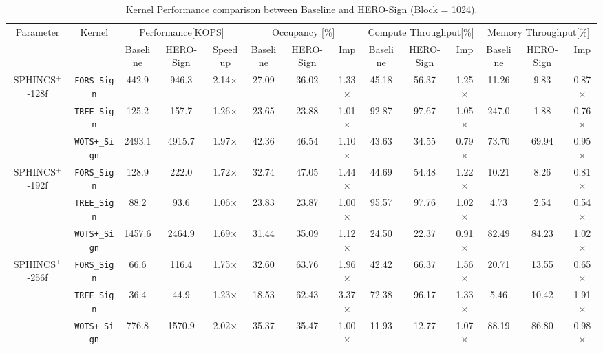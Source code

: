 \documentclass[10pt,conference]{IEEEtran}
\begin{document}
\begin{table}[tp]
\centering
\fontsize{6.}{8}\selectfont
\caption{Kernel Performance comparison between Baseline and HERO-Sign (Block = 1024).}
\label{tab:performance_comparison}
\begin{tabular}{c|c|ccc|ccc|ccc|ccc}
\hline
\multirow{2}{*}{Parameter} & \multirow{2}{*}{Kernel} 
& \multicolumn{3}{c|}{Performance[KOPS]} 
& \multicolumn{3}{c|}{Occupancy [\%]} 
& \multicolumn{3}{c|}{Compute Throughput[\%]} 
& \multicolumn{3}{c}{Memory Throughput[\%]} \\
\cline{3-14}
& & Baseline & HERO-Sign & Speedup & Baseline & HERO-Sign & Imp & Baseline & HERO-Sign & Imp & Baseline & HERO-Sign & Imp \\
\hline\hline
\multirow{3}{*}{SPHINCS$^+$-128f} 
& \texttt{FORS\_Sign} & 442.9 & 946.3 & 2.14× & 27.09 & 36.02 & 1.33× & 45.18 & 56.37 & 1.25× & 11.26 & 9.83 & 0.87× \\
& \texttt{TREE\_Sign} & 125.2 & 157.7 & 1.26× & 23.65 & 23.88 & 1.01× & 92.87 & 97.67 & 1.05× & 247.0 & 1.88 & 0.76× \\
& \texttt{WOTS+\_Sign} & 2493.1 & 4915.7 & 1.97× & 42.36 & 46.54 & 1.10× & 43.63 & 34.55 & 0.79× & 73.70 & 69.94 & 0.95× \\
\hline
\multirow{3}{*}{SPHINCS$^+$-192f} 
& \texttt{FORS\_Sign} & 128.9 & 222.0 & 1.72× & 32.74 & 47.05 & 1.44× & 44.69 & 54.48 & 1.22× & 10.21 & 8.26 & 0.81× \\
& \texttt{TREE\_Sign} & 88.2 & 93.6 & 1.06× & 23.83 & 23.87 & 1.00× & 95.57 & 97.76 & 1.02× & 4.73 & 2.54 & 0.54× \\
& \texttt{WOTS+\_Sign} & 1457.6 & 2464.9 & 1.69× & 31.44 & 35.09 & 1.12× & 24.50 & 22.37 & 0.91× & 82.49 & 84.23 & 1.02× \\
\hline
\multirow{3}{*}{SPHINCS$^+$-256f} 
& \texttt{FORS\_Sign} & 66.6 & 116.4 & 1.75× & 32.60 & 63.76 & 1.96× & 42.42 & 66.37 & 1.56× & 20.71 & 13.55 & 0.65× \\
& \texttt{TREE\_Sign} & 36.4 & 44.9 & 1.23× & 18.53 & 62.43 & 3.37× & 72.38 & 96.17 & 1.33× & 5.46 & 10.42 & 1.91× \\
& \texttt{WOTS+\_Sign} & 776.8 & 1570.9 & 2.02× & 35.37 & 35.47 & 1.00× & 11.93 & 12.77 & 1.07× & 88.19 & 86.80 & 0.98× \\
\hline
\end{tabular}
\end{table}


\end{document}
